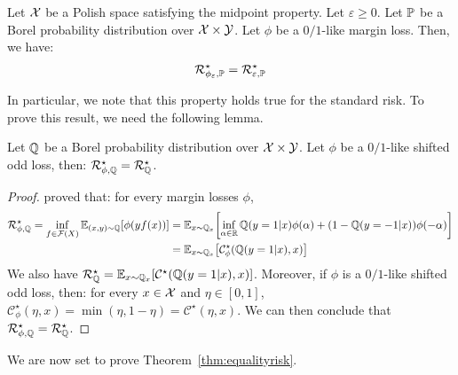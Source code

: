 \begin{thm}
\label{thm:equalityrisk}
Let $\mathcal{X}$ be a Polish space satisfying the midpoint property. Let $\varepsilon\geq 0$. Let $\mathbb{P}$ be a Borel probability distribution over $\mathcal{X}\times\mathcal{Y}$. Let ${\phi}$ be a $0/1$-like margin loss. Then, we have:
\begin{align*}
\mathcal{R}^\star_{{\phi}_\varepsilon,\mathbb{P}} = \mathcal{R}^\star_{\varepsilon,\mathbb{P}}
\end{align*}
\end{thm}

In particular, we note that this property holds true for the standard risk. To prove this result, we need the following lemma.


\begin{lemma}
    \label{lem:equalityriskstandard}
    Let $\mathbb{Q}$ be a Borel probability distribution over $\mathcal{X}\times\mathcal{Y}$. Let ${\phi}$ be a $0/1$-like shifted odd loss, then: $\mathcal{R}_{\phi,\mathbb{Q}}^\star =\mathcal{R}_{\mathbb{Q}}^\star$.
    \end{lemma}
    
    \begin{proof}
    \citet{bartlett2006convexity,steinwart2007compare} proved that: for every margin losses $\phi$,
    \begin{align*}
        \risk_{\phi,\QQ}^\star = \inf_{f\in\mathcal{F}(X)}\mathbb{E}_{(x,y)\sim\QQ}\left[\phi(yf(x))\right] &= \mathbb{E}_{x\sim\QQ_x}\left[\inf_{\alpha\in\RR}\QQ(y=1|x)\phi(\alpha)+(1-\QQ(y=-1|x))\phi(-\alpha)\right]\\
        &= \mathbb{E}_{x\sim\QQ_x}\left[\mathcal{C}_\phi^\star(\QQ(y=1|x),x)\right]\\
    \end{align*}
    We also have $ \risk_{\QQ}^\star =\mathbb{E}_{x\sim\QQ_x}\left[\mathcal{C}^\star(\QQ(y=1|x),x)\right] $. Moreover, if $\phi$ is a $0/1$-like shifted odd loss, then: for every $x\in\mathcal{X}$ and $\eta\in[0,1]$, $\mathcal{C}_\phi^\star(\eta,x) =\min(\eta,1-\eta)=\mathcal{C}^\star(\eta,x)$. We can then conclude that  $\mathcal{R}_{\phi,\mathbb{Q}}^\star =\mathcal{R}_{\mathbb{Q}}^\star$.
    \end{proof}
    
    We are now set to prove Theorem~\ref{thm:equalityrisk}.
    
